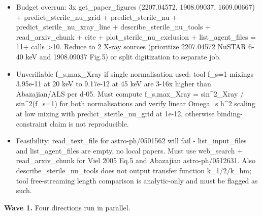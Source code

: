 \documentclass[11pt,a4paper]{article}
\begin{document}
\begin{itemize}
  \item Budget overrun: 3x get\_paper\_figures (2207.04572, 1908.09037, 1609.00667) + predict\_sterile\_nu\_grid + predict\_sterile\_nu + predict\_sterile\_nu\_xray\_line + describe\_sterile\_nu\_tools + read\_arxiv\_chunk + cite + plot\_sterile\_nu\_exclusion + list\_agent\_files = 11+ calls \textgreater{}10. Reduce to 2 X-ray sources (prioritize 2207.04572 NuSTAR 6-40 keV and 1908.09037 Fig.5) or split digitization to separate job.
  \item Unverifiable f\_s,max\_Xray if single normalisation used: tool f\_s=1 mixings 3.95e-11 at 20 keV to 9.17e-12 at 45 keV are 3-16x higher than Abazajian/ALS per d-05. Must compute f\_s,max\_Xray = sin\textasciicircum{}2\_Xray / sin\textasciicircum{}2(f\_s=1) for both normalisations and verify linear Omega\_s h\textasciicircum{}2 scaling at low mixing with predict\_sterile\_nu\_grid at 1e-12, otherwise binding-constraint claim is not reproducible.
  \item Feasibility: read\_text\_file for astro-ph/0501562 will fail - list\_input\_files and list\_agent\_files are empty, no local papers. Must use web\_search + read\_arxiv\_chunk for Viel 2005 Eq.5 and Abazajian astro-ph/0512631. Also describe\_sterile\_nu\_tools does not output transfer function k\_1/2/k\_hm; tool free-streaming length comparison is analytic-only and must be flagged as such.
\end{itemize}
\textbf{Wave 1.} Four directions run in parallel.
\end{document}
